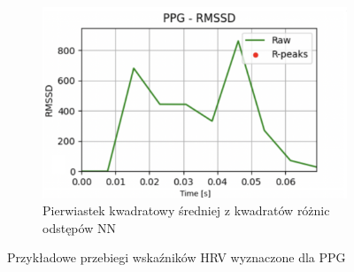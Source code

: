 \documentclass[journal]{IEEEtran}
\begin{document}
\begin{figure}[h]
    \vspace{0.5cm}  
    \begin{subfigure}{0.5\textwidth}
        \centering
        \includegraphics[width=\linewidth]{RMSSD.png}
        \caption{Pierwiastek kwadratowy średniej z kwadratów różnic  odstępów NN}
    \end{subfigure}  
    \caption{Przykładowe przebiegi wskaźników HRV wyznaczone dla PPG}
\end{figure}
 
\end{document}
